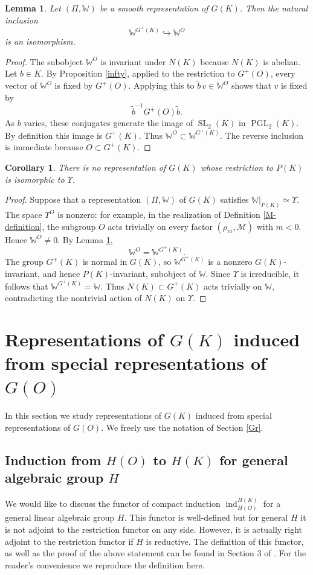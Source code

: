 \documentclass[11pt,a4paper,twoside]{amsart}
\newtheorem{lemma}[theorem]{Lemma}
\newtheorem{corollary}[theorem]{Corollary}
\theoremstyle{definition}
\theoremstyle{remark}
\newcommand{\mW}{\mathbb W}
\newcommand{\mcM}{\mathcal M}
\newcommand{\ind}{\operatorname{ind}}
\newcommand{\SL}{\operatorname{SL}}
\newcommand{\PGL}{\operatorname{PGL}}
\begin{document}
\begin{lemma}\label{Gplus-invariants}
Let $(\Pi,\mW)$ be a smooth representation of $G(K)$. Then the natural inclusion
$$
\mW^{G^+(K)}\hookrightarrow\mW^O
$$
is an isomorphism.
\end{lemma}
\begin{proof}
The subobject $\mW^O$ is invariant under $N(K)$ because $N(K)$ is abelian. Let $b\in K$. By Proposition \ref{infty}, applied to the restriction to $G^+(O)$, every vector of $\mW^O$ is fixed by $G^+(O)$. Applying this to $\widetilde b\,v\in\mW^O$ shows that $v$ is fixed by
$$
\widetilde b^{-1}G^+(O)\widetilde b.
$$
As $b$ varies, these conjugates generate the image of $\SL_2(K)$ in $\PGL_2(K)$. By definition this image is $G^+(K)$. Thus $\mW^O\subset\mW^{G^+(K)}$. The reverse inclusion is immediate because $O\subset G^+(K)$.
\end{proof}
\begin{corollary}\label{no-rest}There is no representation of $G(K)$ whose restriction to $P(K)$ is isomorphic to $\Upsilon$.
\end{corollary}
\begin{proof}
Suppose that a representation $(\Pi,\mW)$ of $G(K)$ satisfies $\mW|_{P(K)}\simeq\Upsilon$. The space $\Upsilon^O$ is nonzero: for example, in the realization of Definition \ref{M-definition}, the subgroup $O$ acts trivially on every factor $(\rho_m,\mcM)$ with $m<0$. Hence $\mW^O\neq0$. By Lemma \ref{Gplus-invariants},
$$
\mW^O=\mW^{G^+(K)}.
$$
The group $G^+(K)$ is normal in $G(K)$, so $\mW^{G^+(K)}$ is a nonzero $G(K)$-invariant, and hence $P(K)$-invariant, subobject of $\mW$. Since $\Upsilon$ is irreducible, it follows that $\mW^{G^+(K)}=\mW$. Thus $N(K)\subset G^+(K)$ acts trivially on $\mW$, contradicting the nontrivial action of $N(K)$ on $\Upsilon$.
\end{proof}

\section{Representations of $G(K)$ induced from special representations of $G(O)$}\label{GKinduced}
In this section we study representations of $G(K)$ induced from special representations of $G(O)$. We freely use the notation of Section \ref{Gr}.

\subsection{Induction from $H(O)$ to $H(K)$ for general algebraic group $H$}\label{ind-gen}
We would like to discuss the functor of compact induction $\ind_{H(O)}^{H(K)}$ for a general linear algebraic group $H$. This functor is well-defined but for general $H$ it is not adjoint to the restriction functor on any side. However, it is actually right adjoint to the restriction functor if $H$ is reductive. The definition of this functor, as well as the proof of the above statement can be found in Section 3 of \cite{GK}. For the reader's convenience we reproduce the definition here.
\end{document}
